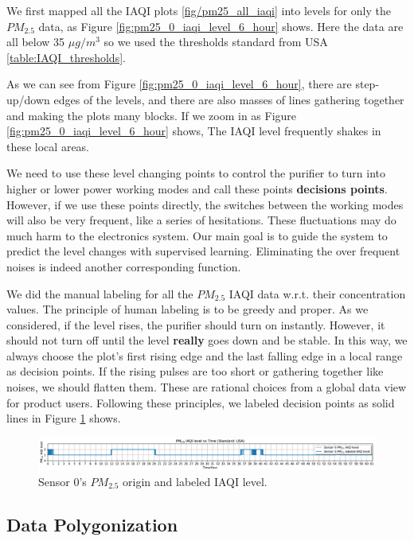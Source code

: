 We first mapped all the IAQI plots \ref{fig/pm25_all_iaqi} into levels for only the $PM_{2.5}$ data, as Figure \ref{fig:pm25_0_iaqi_level_6_hour} shows. Here the data are all below 35 $\mu g/m^3$ so we used the thresholds standard from USA \ref{table:IAQI_thresholds}.

As we can see from Figure \ref{fig:pm25_0_iaqi_level_6_hour}, there are step-up/down edges of the levels, and there are also masses of lines gathering together and making the plots many blocks. If we zoom in as Figure \ref{fig:pm25_0_iaqi_level_6_hour} shows,  The IAQI level frequently shakes in these local areas.

We need to use these level changing points to control the purifier to turn into higher or lower power working modes and call these points \textbf{decisions points}. However, if we use these points directly, the switches between the working modes will also be very frequent, like a series of hesitations. These fluctuations may do much harm to the electronics system. Our main goal is to guide the system to predict the level changes with supervised learning. Eliminating the over frequent noises is indeed another corresponding function.

We did the manual labeling for all the $PM_{2.5}$ IAQI data w.r.t. their concentration values. The principle of human labeling is to be greedy and proper. As we considered, if the level rises, the purifier should turn on instantly. However, it should not turn off until the level \textbf{really} goes down and be stable. In this way, we always choose the plot's first rising edge and the last falling edge in a local range as decision points. If the rising pulses are too short or gathering together like noises, we should flatten them. These are rational choices from a global data view for product users. Following these principles, we labeled decision points as solid lines in Figure \ref{fig:pm25_0_origin_and_labeled_level} shows.

\begin{figure}
    \centering
    \includegraphics[width=\linewidth]{fig/labeled_iaqi_level/origin_and_labeled/pm25_0.png}
    \caption{Sensor 0's $PM_{2.5}$ origin and labeled IAQI level.}
    \label{fig:pm25_0_origin_and_labeled_level}
\end{figure}

\subsection{Data Polygonization}

